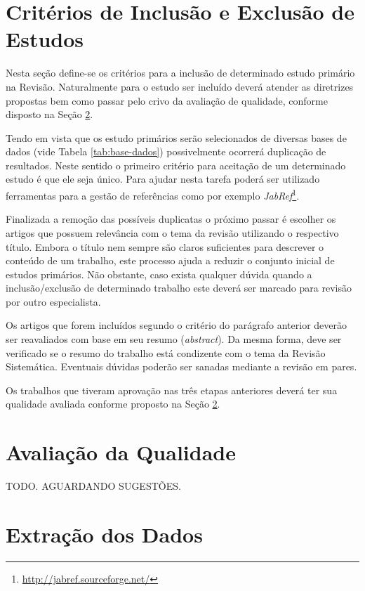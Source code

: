 \documentclass{article}
\begin{document}
\section{Critérios de Inclusão e Exclusão de Estudos}
\label{sec:criterios_in_out}

Nesta seção define-se os critérios para a inclusão de determinado estudo
primário na Revisão. Naturalmente para o estudo ser incluído deverá atender as diretrizes propostas bem
como passar pelo crivo da avaliação de qualidade, conforme disposto na Seção
\ref{sec:qualidade}.

Tendo em vista que os estudo primários serão selecionados de diversas bases de
dados (vide Tabela \ref{tab:base-dados}) possivelmente ocorrerá duplicação de
resultados. Neste sentido o primeiro critério para aceitação de um determinado
estudo é que ele seja único. Para ajudar nesta tarefa poderá ser utilizado
ferramentas para a gestão de referências como por exemplo
\textit{JabRef}\footnote{\url{http://jabref.sourceforge.net/}}.

Finalizada a remoção das possíveis duplicatas o próximo passar é escolher os
artigos que possuem relevância com o tema da revisão utilizando o respectivo
título. Embora o título nem sempre são claros suficientes para  descrever o conteúdo de um trabalho, este processo ajuda a reduzir o conjunto inicial de
estudos primários. Não obstante, caso exista qualquer dúvida quando a
inclusão/exclusão de determinado trabalho este deverá ser marcado para revisão
por outro especialista.

Os artigos que forem incluídos segundo o critério do parágrafo anterior deverão
ser reavaliados com base em seu resumo (\textit{abstract}). Da mesma forma,
deve ser verificado se o resumo do trabalho está condizente com o tema da
Revisão Sistemática. Eventuais dúvidas poderão ser sanadas mediante a revisão
em pares.

Os trabalhos que tiveram aprovação nas três etapas anteriores deverá ter sua
qualidade avaliada conforme proposto na Seção \ref{sec:qualidade}.

\section{Avaliação da Qualidade}
\label{sec:qualidade}

TODO. AGUARDANDO SUGESTÕES.

\section{Extração dos Dados}
\label{sec:extracao_dados}
\end{document}
